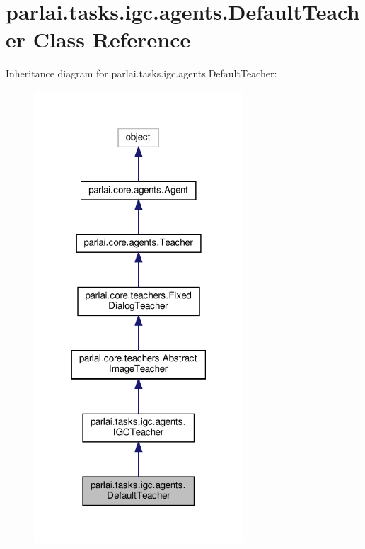 \hypertarget{classparlai_1_1tasks_1_1igc_1_1agents_1_1DefaultTeacher}{}\section{parlai.\+tasks.\+igc.\+agents.\+Default\+Teacher Class Reference}
\label{classparlai_1_1tasks_1_1igc_1_1agents_1_1DefaultTeacher}


Inheritance diagram for parlai.\+tasks.\+igc.\+agents.\+Default\+Teacher\+:
\nopagebreak
\begin{figure}[H]
\begin{center}
\leavevmode
\includegraphics[width=222pt]{da/de0/classparlai_1_1tasks_1_1igc_1_1agents_1_1DefaultTeacher__inherit__graph}
\end{center}
\end{figure}


